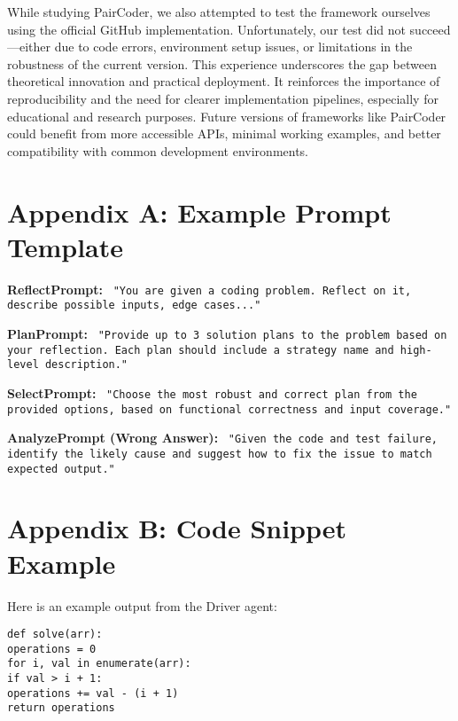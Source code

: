 \documentclass[11pt,a4paper]{article}
\begin{document}
While studying PairCoder, we also attempted to test the framework ourselves using the official GitHub implementation. Unfortunately, our test did not succeed—either due to code errors, environment setup issues, or limitations in the robustness of the current version. This experience underscores the gap between theoretical innovation and practical deployment. It reinforces the importance of reproducibility and the need for clearer implementation pipelines, especially for educational and research purposes. Future versions of frameworks like PairCoder could benefit from more accessible APIs, minimal working examples, and better compatibility with common development environments.




\newpage
\appendix
\appendix
\section{Appendix A: Example Prompt Template}
\textbf{ReflectPrompt:} \
\texttt{"You are given a coding problem. Reflect on it, describe possible inputs, edge cases..."}

\textbf{PlanPrompt:} \
\texttt{"Provide up to 3 solution plans to the problem based on your reflection. Each plan should include a strategy name and high-level description."}

\textbf{SelectPrompt:} \
\texttt{"Choose the most robust and correct plan from the provided options, based on functional correctness and input coverage."}

\textbf{AnalyzePrompt (Wrong Answer):} \
\texttt{"Given the code and test failure, identify the likely cause and suggest how to fix the issue to match expected output."}

\section{Appendix B: Code Snippet Example}
Here is an example output from the Driver agent:
\begin{verbatim}
def solve(arr):
operations = 0
for i, val in enumerate(arr):
if val > i + 1:
operations += val - (i + 1)
return operations
\end{verbatim}


\end{document}
